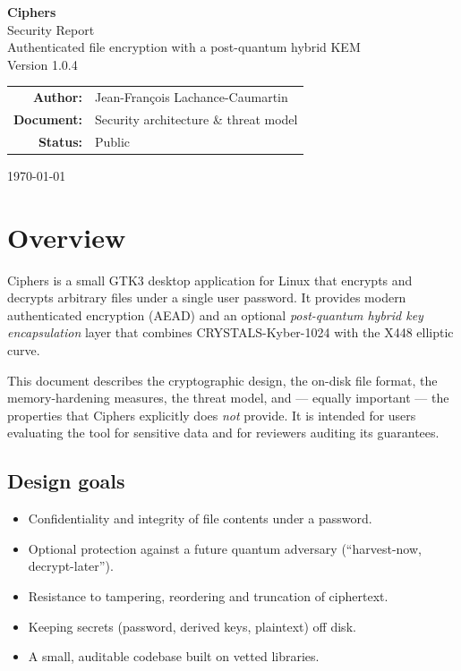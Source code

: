 \documentclass[11pt,a4paper]{article}
\begin{document}
\begin{titlepage}
\centering
\vspace*{3cm}
{\Huge\bfseries\color{ink} Ciphers}\\[0.4cm]
{\Large Security Report}\\[1.5cm]
{\large Authenticated file encryption with a post-quantum hybrid KEM}\\[0.3cm]
{\large Version 1.0.4}\\[2.5cm]

\begin{tabular}{rl}
\textbf{Author:} & Jean-François Lachance-Caumartin\\[0.2cm]
\textbf{Document:} & Security architecture \& threat model\\[0.2cm]
\textbf{Status:} & Public\\
\end{tabular}

\vfill
{\large \today}
\end{titlepage}

\tableofcontents
\newpage

\section{Overview}

Ciphers is a small GTK3 desktop application for Linux that encrypts and
decrypts arbitrary files under a single user password. It provides modern
authenticated encryption (AEAD) and an optional \emph{post-quantum hybrid key
encapsulation} layer that combines CRYSTALS-Kyber-1024 with the X448
elliptic curve.

This document describes the cryptographic design, the on-disk file format,
the memory-hardening measures, the threat model, and — equally important —
the properties that Ciphers explicitly does \emph{not} provide. It is
intended for users evaluating the tool for sensitive data and for reviewers
auditing its guarantees.

\subsection{Design goals}
\begin{itemize}[leftmargin=1.4em]
  \item Confidentiality and integrity of file contents under a password.
  \item Optional protection against a future quantum adversary
        (``harvest-now, decrypt-later'').
  \item Resistance to tampering, reordering and truncation of ciphertext.
  \item Keeping secrets (password, derived keys, plaintext) off disk.
  \item A small, auditable codebase built on vetted libraries.
\end{itemize}
\end{document}
